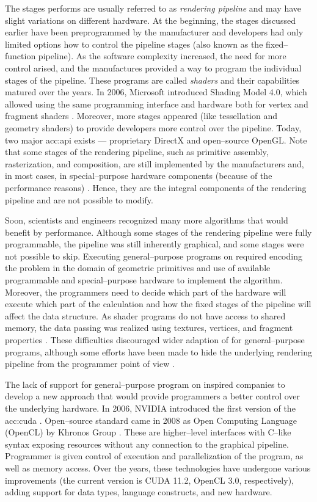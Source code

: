 The stages \gpu performs are usually referred to as \emph{rendering pipeline} and may have slight variations on different hardware. At the beginning, the stages discussed earlier have been preprogrammed by the manufacturer and developers had only limited options how to control the pipeline stages (also known as the fixed--function pipeline). As the software complexity increased, the need for more control arised, and the manufactures provided a way to program the individual stages of the pipeline. These programs are called \emph{shaders} and their capabilities matured over the years. In 2006, Microsoft introduced Shading Model 4.0, which allowed using the same programming interface and hardware both for vertex and fragment shaders \citep{DirectX10}. Moreover, more stages appeared (like tessellation and geometry shaders) to provide developers more control over the pipeline. Today, two major \acrshort{acc:api} exists --- proprietary  DirectX and open--source OpenGL. Note that some stages of the rendering pipeline, such as primitive assembly, rasterization, and composition, are still implemented by the \gpu manufacturers and, in most cases, in special--purpose hardware components (because of the performance reasons) \citep{SoftwareRasterization}. Hence, they are the integral components of the rendering pipeline and are not possible to modify.

Soon, scientists and engineers recognized many more algorithms that would benefit by \gpu performance. Although some stages of the rendering pipeline were fully programmable, the pipeline was still inherently graphical, and some stages were not possible to skip. Executing general--purpose programs on \gpu required encoding the problem in the domain of geometric primitives and use of available programmable and special--purpose hardware to implement the algorithm. Moreover, the programmers need to decide which part of the hardware will execute which part of the calculation and how the fixed stages of the pipeline will affect the data structure. As shader programs do not have access to shared memory, the data passing was realized using textures, vertices, and fragment properties \citep{GPUComputingOwens}. These difficulties discouraged wider adaption of \gpu for general--purpose programs, although some efforts have been made to hide the underlying rendering pipeline from the programmer point of view \mbox{\citep{BrookGPU}}.

The lack of support for general--purpose program on \gpu inspired companies to develop a new approach that would provide programmers a better control over the underlying hardware. In 2006, NVIDIA introduced the first version of the \acrfull{acc:cuda} \citep{CUDAabout}. Open--source standard came in 2008 as Open Computing Language (OpenCL) by Khronos Group \citep{OpenCLRelease}. These are higher--level interfaces with C--like syntax exposing \gpu resources without any connection to the graphical pipeline. Programmer is given control of execution and parallelization of the program, as well as memory access. Over the years, these technologies have undergone various improvements (the current version is CUDA 11.2, OpenCL 3.0, respectively), adding support for data types, language constructs, and new hardware.

